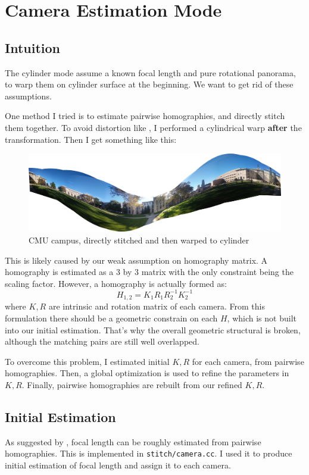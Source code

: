 
\section{Camera Estimation Mode}
\label{sec:camera_estimate}
\subsection{Intuition}
The cylinder mode assume a known focal length and pure rotational panorama, to
warp them on cylinder surface at the beginning.
We want to get rid of these assumptions.

One method I tried is to estimate pairwise homographies,
and directly stitch them together. To avoid distortion like ,
I performed a cylindrical warp \textbf{after} the transformation.
Then I get something like this:
\begin{figure}[H]
  \centering
  \includegraphics[width=1\textwidth]{res/CMU1-noestimate.jpg}
  \caption{CMU campus, directly stitched and then warped to cylinder}
\end{figure}

This is likely caused by our weak assumption on homography matrix.
A homography is estimated as a 3 by 3 matrix with the only
constraint being the scaling factor. However,
a homography is actually formed as:
\[ H_{1,2} = K_1R_1R_2^{-1}K_2^{-1}\]
where $K,R$ are intrinsic and rotation matrix of each camera.
From this formulation there should be a geometric constrain on each $H$,
which is not built into our initial estimation.
That's why the overall geometric structural is broken, although the matching pairs
are still well overlapped.

To overcome this problem, I estimated initial $K, R$ for each camera, from pairwise homographies.
Then, a global optimization is used to refine the parameters in $K, R$.
Finally, pairwise homographies are rebuilt from our refined $K, R$.

\subsection{Initial Estimation}
As suggested by \cite{focal}, focal length
can be roughly estimated from pairwise homographies. This is implemented in \verb|stitch/camera.cc|.
I used it to produce initial estimation of
focal length and assign it to each camera.

